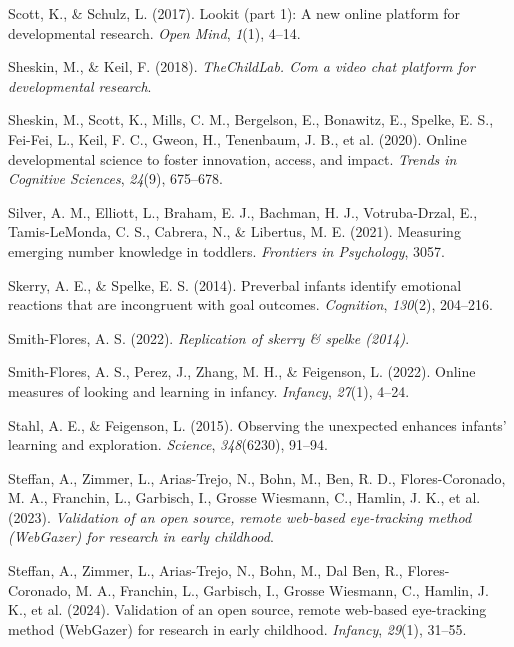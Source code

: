 \documentclass[
  man,floatsintext]{apa6}
\newlength{\cslhangindent}
\newlength{\cslentryspacingunit} %
\newenvironment{CSLReferences}[2] %
 {%
  \setlength{\parindent}{0pt}
  \ifodd #1
  \let\oldpar\par
  \def\par{\hangindent=\cslhangindent\oldpar}
  \fi
  \setlength{\parskip}{#2\cslentryspacingunit}
 }%
 {}
\begin{document}
\begin{CSLReferences}{1}{0}
\leavevmode{}%
Scott, K., \& Schulz, L. (2017). Lookit (part 1): A new online platform for developmental research. \emph{Open Mind}, \emph{1}(1), 4--14.

\leavevmode{}%
Sheskin, M., \& Keil, F. (2018). \emph{TheChildLab. Com a video chat platform for developmental research}.

\leavevmode{}%
Sheskin, M., Scott, K., Mills, C. M., Bergelson, E., Bonawitz, E., Spelke, E. S., Fei-Fei, L., Keil, F. C., Gweon, H., Tenenbaum, J. B., et al. (2020). Online developmental science to foster innovation, access, and impact. \emph{Trends in Cognitive Sciences}, \emph{24}(9), 675--678.

\leavevmode{}%
Silver, A. M., Elliott, L., Braham, E. J., Bachman, H. J., Votruba-Drzal, E., Tamis-LeMonda, C. S., Cabrera, N., \& Libertus, M. E. (2021). Measuring emerging number knowledge in toddlers. \emph{Frontiers in Psychology}, 3057.

\leavevmode{}%
Skerry, A. E., \& Spelke, E. S. (2014). Preverbal infants identify emotional reactions that are incongruent with goal outcomes. \emph{Cognition}, \emph{130}(2), 204--216.

\leavevmode{}%
Smith-Flores, A. S. (2022). \emph{Replication of skerry \& spelke (2014)}.

\leavevmode{}%
Smith-Flores, A. S., Perez, J., Zhang, M. H., \& Feigenson, L. (2022). Online measures of looking and learning in infancy. \emph{Infancy}, \emph{27}(1), 4--24.

\leavevmode{}%
Stahl, A. E., \& Feigenson, L. (2015). Observing the unexpected enhances infants' learning and exploration. \emph{Science}, \emph{348}(6230), 91--94.

\leavevmode{}%
Steffan, A., Zimmer, L., Arias-Trejo, N., Bohn, M., Ben, R. D., Flores-Coronado, M. A., Franchin, L., Garbisch, I., Grosse Wiesmann, C., Hamlin, J. K., et al. (2023). \emph{Validation of an open source, remote web-based eye-tracking method (WebGazer) for research in early childhood}.

\leavevmode{}%
Steffan, A., Zimmer, L., Arias-Trejo, N., Bohn, M., Dal Ben, R., Flores-Coronado, M. A., Franchin, L., Garbisch, I., Grosse Wiesmann, C., Hamlin, J. K., et al. (2024). Validation of an open source, remote web-based eye-tracking method (WebGazer) for research in early childhood. \emph{Infancy}, \emph{29}(1), 31--55.


\end{CSLReferences}
\end{document}

